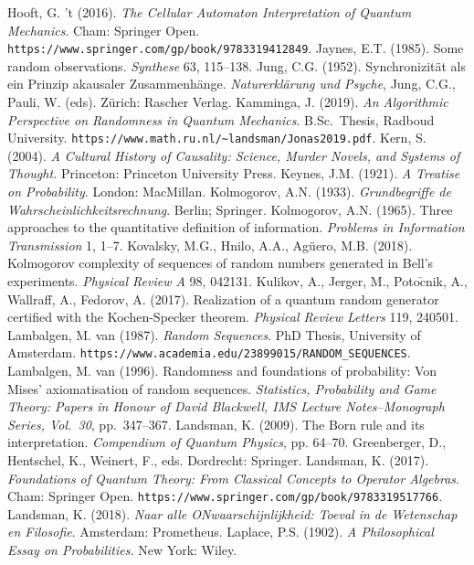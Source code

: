 \documentclass[12pt]{article}
\numberwithin{equation}{section}
\begin{document}
\begin{thebibliography}{99}
 \bibitem{}Hooft, G. 't (2016).
\emph{The Cellular Automaton Interpretation of Quantum Mechanics}. Cham: Springer Open. 
\verb#https://www.springer.com/gp/book/9783319412849#.
 \bibitem{} Jaynes, E.T. (1985). Some random observations. \emph{Synthese} 63, 115--138. 
 \bibitem{}  Jung, C.G. (1952). Synchronizit\"{a}t als ein Prinzip akausaler 
 Zusammenh\"{a}nge. \emph{Naturerkl\"{a}rung und Psyche}, 
 Jung, C.G., Pauli, W. (eds).  Z\"{u}rich: Rascher Verlag. 
   \bibitem{} Kamminga, J. (2019). \emph{An Algorithmic Perspective on Randomness in Quantum Mechanics}.
   B.Sc.\ Thesis, Radboud University. \verb#https://www.math.ru.nl/~landsman/Jonas2019.pdf#.
  \bibitem{} Kern, S. (2004). \emph{A Cultural History of Causality: Science, Murder Novels, and Systems of Thought.}
  Princeton: Princeton University Press. 
 \bibitem{} Keynes, J.M. (1921). \emph{A Treatise on Probability}. London: MacMillan. 
  \bibitem{} Kolmogorov, A.N. (1933). \emph{Grundbegriffe de Wahrscheinlichkeitsrechnung}. Berlin; Springer. 
    \bibitem{} Kolmogorov, A.N. (1965). Three approaches to the quantitative definition of information.
    \emph{Problems in Information Transmission} 1, 1--7. 
  \bibitem{}   Kovalsky, M.G.,  Hnilo, A.A., Ag\"{u}ero, M.B. (2018).  Kolmogorov complexity of sequences of random numbers generated in Bell's experiments. \emph{Physical Review A} 98, 042131.
  \bibitem{}   Kulikov, A.,  Jerger, M.,  Poto$\check{\mathrm{c}}$nik, A.,  Wallraff, A., Fedorov, A. (2017). Realization of a
    quantum random generator certified with the Kochen-Specker theorem. \emph{Physical Review Letters} 119, 240501.  
  \bibitem{} Lambalgen, M. van (1987). \emph{Random Sequences}. PhD Thesis, University of Amsterdam. \verb#https://www.academia.edu/23899015/RANDOM_SEQUENCES#.
    \bibitem{} Lambalgen, M. van (1996). Randomness and foundations of probability: Von Mises' axiomatisation of random sequences. \emph{Statistics, Probability and Game Theory: Papers in Honour of David Blackwell, IMS Lecture Notes--Monograph Series, Vol.\ 30}, pp.\ 347--367. 
   \bibitem{} Landsman, K. (2009). The Born rule and its interpretation.
  \emph{Compendium of Quantum Physics}, pp. 64--70.  Greenberger, D., Hentschel, K., Weinert, F., eds.  Dordrecht: Springer.
\bibitem{}   Landsman, K. (2017). \emph{Foundations of Quantum Theory: From Classical Concepts to Operator Algebras}. 
Cham: Springer Open. \verb#https://www.springer.com/gp/book/9783319517766#.
\bibitem{}   Landsman, K. (2018). \emph{Naar alle ONwaarschijnlijkheid: Toeval in de Wetenschap en Filosofie}. Amsterdam: Prometheus. 
\bibitem{} Laplace, P.S. (1902). \emph{A Philosophical Essay on Probabilities.} New York: Wiley. 

\end{thebibliography}
\end{document}
